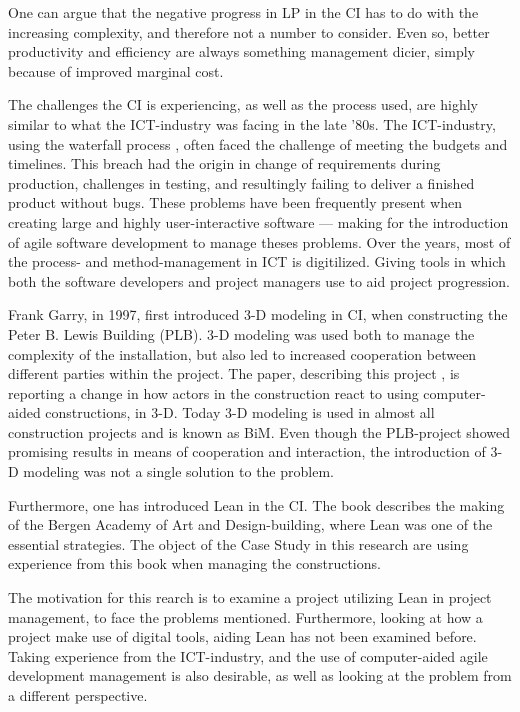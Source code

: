 One can argue that the negative progress in LP in the CI has to do with the increasing complexity, and therefore not a number to consider. Even so, better productivity and efficiency are always something management dicier, simply because of improved marginal cost.

The challenges the CI is experiencing, as well as the process used, are highly similar to what the ICT-industry was facing in the late '80s. The ICT-industry, using the waterfall process \cite{royce}, often faced the challenge of meeting the budgets and timelines. This breach had the origin in change of requirements during production, challenges in testing, and resultingly failing to deliver a finished product without bugs. These problems have been frequently present when creating large and highly user-interactive software — making for the introduction of agile software development to manage theses problems. Over the years, most of the process- and method-management in ICT is digitilized. Giving tools in which both the software developers and project managers use to aid project progression.  

Frank Garry, in 1997, first introduced 3-D modeling in CI, when constructing the Peter B. Lewis Building (PLB). 3-D modeling was used both to manage the complexity of the installation, but also led to increased cooperation between different parties within the project. The paper, describing this project \cite{frank_garry}, is reporting a change in how actors in the construction react to using computer-aided constructions, in 3-D. Today 3-D modeling is used in almost all construction projects and is known as BiM. Even though the PLB-project showed promising results in means of cooperation and interaction, the introduction of 3-D modeling was not a single solution to the problem.

Furthermore, one has introduced Lean in the CI. The book \cite{lean_i_praksis} describes the making of the Bergen Academy of Art and Design-building, where Lean was one of the essential strategies. The object of the Case Study in this research are using experience from this book when managing the constructions. 

The motivation for this rearch is to examine a project utilizing Lean in project management, to face the problems mentioned. Furthermore, looking at how a project make use of digital tools, aiding Lean has not been examined before. Taking experience from the ICT-industry, and the use of computer-aided agile development management is also desirable, as well as looking at the problem from a different perspective.

